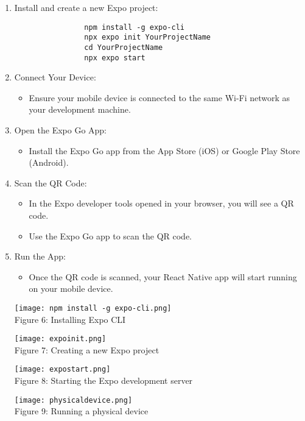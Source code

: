 \documentclass{article}
\begin{document}
        \begin{enumerate}
            \item Install and create a new Expo project:
                \begin{verbatim}
                npm install -g expo-cli
                npx expo init YourProjectName
                cd YourProjectName
                npx expo start
                \end{verbatim}
                 \item Connect Your Device:
                \begin{itemize}
                    \item Ensure your mobile device is connected to the same Wi-Fi network as your development machine.
                \end{itemize}
            \item Open the Expo Go App:
                \begin{itemize}
                    \item Install the Expo Go app from the App Store (iOS) or Google Play Store (Android).
                \end{itemize}
            \item Scan the QR Code:
                \begin{itemize}
                    \item In the Expo developer tools opened in your browser, you will see a QR code.
                    \item Use the Expo Go app to scan the QR code.
                \end{itemize}
            \item Run the App:
                \begin{itemize}
                    \item Once the QR code is scanned, your React Native app will start running on your mobile device.
                \end{itemize}
                
                   \centering
                        \texttt{[image: npm install -g expo-cli.png]}\\
                        \caption{Figure 6: Installing Expo CLI}
                    \centering
                        \texttt{[image: expoinit.png]}\\
                        \caption{Figure 7: Creating a new Expo project}
                    \centering
                        \texttt{[image: expostart.png]}\\
                        \caption{Figure 8: Starting the Expo development server}
                        
                    \centering
                        \texttt{[image: physicaldevice.png]}\\
                        \caption{Figure 9: Running a physical device}
                        \label{Physical Device}
                        
         
        \end{enumerate}
\end{document}
